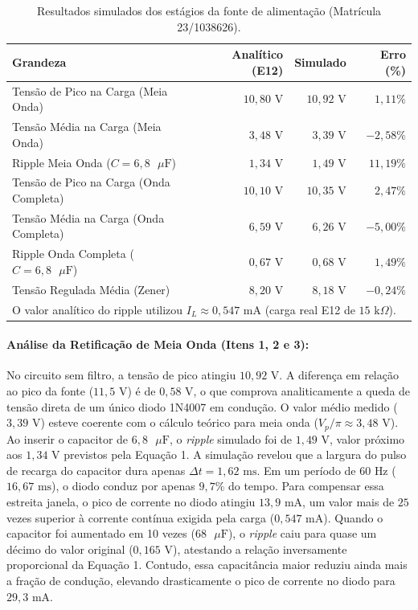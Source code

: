 \documentclass[11pt,a4paper]{article}
\begin{document}
\begin{table}[H]
    \centering
    \caption{Resultados simulados dos estágios da fonte de alimentação (Matrícula 23/1038626).}
    \label{tab:resultados_cardoso}
    \renewcommand{\arraystretch}{1.2}
    \begin{tabular}{@{}lrrr@{}}
    \toprule
    \textbf{Grandeza} & \textbf{Analítico (E12)} & \textbf{Simulado} & \textbf{Erro (\%)} \\
    \midrule    
    Tensão de Pico na Carga (Meia Onda) & $10{,}80\text{ V}$ & $10{,}92\text{ V}$ & $1{,}11\%$ \\
    Tensão Média na Carga (Meia Onda) & $3{,}48\text{ V}$ & $3{,}39\text{ V}$ & $-2{,}58\%$ \\
    Ripple Meia Onda ($C=6{,}8\text{ }\mu\text{F}$) & $1{,}34\text{ V}$ & $1{,}49\text{ V}$ & $11{,}19\%$ \\
    Tensão de Pico na Carga (Onda Completa) & $10{,}10\text{ V}$ & $10{,}35\text{ V}$ & $2{,}47\%$ \\
    Tensão Média na Carga (Onda Completa) & $6{,}59\text{ V}$ & $6{,}26\text{ V}$ & $-5{,}00\%$ \\
    Ripple Onda Completa ($C=6{,}8\text{ }\mu\text{F}$) & $0{,}67\text{ V}$ & $0{,}68\text{ V}$ & $1{,}49\%$ \\
    Tensão Regulada Média (Zener) & $8{,}20\text{ V}$ & $8{,}18\text{ V}$ & $-0{,}24\%$ \\
    \bottomrule
    \multicolumn{4}{l}{\footnotesize O valor analítico do ripple utilizou $I_L \approx 0{,}547\text{ mA}$ (carga real E12 de $15\text{ k}\Omega$).}
    \end{tabular}
\end{table}

\paragraph{Análise da Retificação de Meia Onda (Itens 1, 2 e 3):}
No circuito sem filtro, a tensão de pico atingiu $10{,}92\text{ V}$. A diferença em relação ao pico da fonte ($11{,}5\text{ V}$) é de $0{,}58\text{ V}$, o que comprova analiticamente a queda de tensão direta de um único diodo 1N4007 em condução. O valor médio medido ($3{,}39\text{ V}$) esteve coerente com o cálculo teórico para meia onda ($V_p/\pi \approx 3{,}48\text{ V}$).
Ao inserir o capacitor de $6{,}8\text{ }\mu\text{F}$, o \textit{ripple} simulado foi de $1{,}49\text{ V}$, valor próximo aos $1{,}34\text{ V}$ previstos pela Equação 1. A simulação revelou que a largura do pulso de recarga do capacitor dura apenas $\Delta t = 1{,}62\text{ ms}$. Em um período de $60\text{ Hz}$ ($16{,}67\text{ ms}$), o diodo conduz por apenas $9{,}7\%$ do tempo. Para compensar essa estreita janela, o pico de corrente no diodo atingiu $13{,}9\text{ mA}$, um valor mais de $25$ vezes superior à corrente contínua exigida pela carga ($0{,}547\text{ mA}$).
Quando o capacitor foi aumentado em 10 vezes ($68\text{ }\mu\text{F}$), o \textit{ripple} caiu para quase um décimo do valor original ($0{,}165\text{ V}$), atestando a relação inversamente proporcional da Equação 1. Contudo, essa capacitância maior reduziu ainda mais a fração de condução, elevando drasticamente o pico de corrente no diodo para $29{,}3\text{ mA}$.
\end{document}
